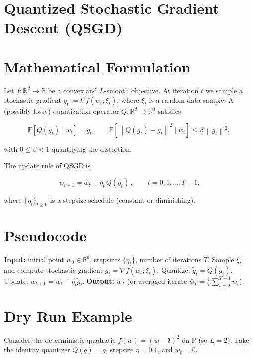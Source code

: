 \documentclass{article}
\newcommand{\E}{\mathbb{E}}
\newcommand{\R}{\mathbb{R}}
\newcommand{\norm}[1]{\left\|#1\right\|}
\begin{document}
\section*{Quantized Stochastic Gradient Descent (QSGD)}

\section*{Mathematical Formulation}
Let $f:\R^{d}\rightarrow\R$ be a convex and $L$-smooth objective.  
At iteration $t$ we sample a stochastic gradient $g_t:=\nabla f(w_t;\xi_t)$, where $\xi_t$ is a random data sample.  
A (possibly lossy) quantization operator $Q:\R^{d}\rightarrow\R^{d}$ satisfies  

\[
\E[Q(g_t)\mid w_t]=g_t ,\qquad 
\E\!\left[\norm{Q(g_t)-g_t}^{2}\mid w_t\right]\leq \beta \,\norm{g_t}^{2},
\tag{1}
\]

with $0\le\beta<1$ quantifying the distortion.  

The update rule of QSGD is  

\[
\boxed{\,w_{t+1}=w_{t}-\eta_t\, Q(g_t)\,},\qquad t=0,1,\dots,T-1,
\tag{2}
\]

where $\{\eta_t\}_{t\ge0}$ is a stepsize schedule (constant or diminishing).

\section*{Pseudocode}
\begin{algorithm}[H]
\caption{Quantized Stochastic Gradient Descent}
\begin{algorithmic}[1]
\State \textbf{Input:} initial point $w_0\in\R^{d}$, stepsizes $\{\eta_t\}$, number of iterations $T$.
    \State Sample $\xi_t$ and compute stochastic gradient $g_t=\nabla f(w_t;\xi_t)$.
    \State Quantize: $\tilde g_t = Q(g_t)$.
    \State Update: $w_{t+1}=w_t-\eta_t \tilde g_t$.
\EndFor
\State \textbf{Output:} $w_T$ (or averaged iterate $\bar w_T=\frac1T\sum_{t=0}^{T-1}w_t$).
\end{algorithmic}
\end{algorithm}

\section*{Dry Run Example}
Consider the deterministic quadratic $f(w)=(w-3)^2$ on $\R$ (so $L=2$).  
Take the identity quantizer $Q(g)=g$, stepsize $\eta=0.1$, and $w_0=0$.
\end{document}
